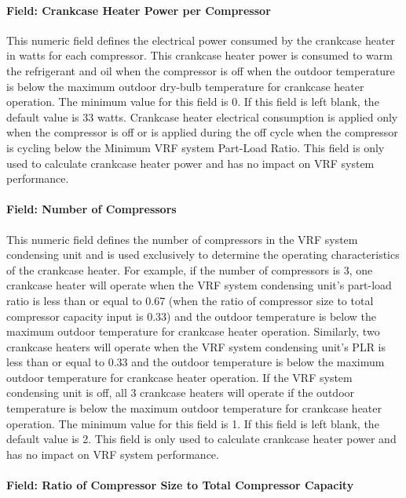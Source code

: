 \paragraph{Field: Crankcase Heater Power per Compressor}

This numeric field defines the electrical power consumed by the crankcase heater in watts for each compressor. This crankcase heater power is consumed to warm the refrigerant and oil when the compressor is off when the outdoor temperature is below the maximum outdoor dry-bulb temperature for crankcase heater operation. The minimum value for this field is 0. If this field is left blank, the default value is 33 watts. Crankcase heater electrical consumption is applied only when the compressor is off or is applied during the off cycle when the compressor is cycling below the Minimum VRF system Part-Load Ratio. This field is only used to calculate crankcase heater power and has no impact on VRF system performance.

\paragraph{Field: Number of Compressors}

This numeric field defines the number of compressors in the VRF system condensing unit and is used exclusively to determine the operating characteristics of the crankcase heater. For example, if the number of compressors is 3, one crankcase heater will operate when the VRF system condensing unit's part-load ratio is less than or equal to 0.67 (when the ratio of compressor size to total compressor capacity input is 0.33) and the outdoor temperature is below the maximum outdoor temperature for crankcase heater operation. Similarly, two crankcase heaters will operate when the VRF system condensing unit's PLR is less than or equal to 0.33 and the outdoor temperature is below the maximum outdoor temperature for crankcase heater operation. If the VRF system condensing unit is off, all 3 crankcase heaters will operate if the outdoor temperature is below the maximum outdoor temperature for crankcase heater operation. The minimum value for this field is 1. If this field is left blank, the default value is 2. This field is only used to calculate crankcase heater power and has no impact on VRF system performance.

\paragraph{Field: Ratio of Compressor Size to Total Compressor Capacity}

